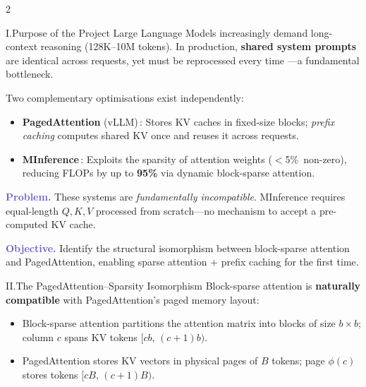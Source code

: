 \documentclass[a0paper]{article}
\begin{document}
\setlength{\columnsep}{1.6cm}
\begin{multicols}{2}

\begin{posterbox}{I.\;\;Purpose of the Project}
  Large Language Models increasingly demand long-context reasoning
  (128K--10M tokens). In production, \textbf{shared system prompts}
  are identical across requests, yet must be reprocessed every time
  ---a fundamental bottleneck.

  \vspace{0.3em}
  Two complementary optimisations exist independently:
  \begin{itemize}[leftmargin=1.6em, itemsep=0.25em, topsep=0.2em]
    \item \textbf{PagedAttention} (vLLM)\,: Stores KV caches in
      fixed-size blocks; \textit{prefix caching} computes shared KV
      once and reuses it across requests.
    \item \textbf{MInference}\,: Exploits the sparsity of attention
      weights ($<$5\%\ non-zero), reducing FLOPs by up to
      \textbf{95\%} via dynamic block-sparse attention.
  \end{itemize}

  \vspace{0.3em}
  \begin{hlbox}
    \textcolor{SlateBlue}{\textbf{Problem.}}\;
    These systems are \textit{fundamentally incompatible}.
    MInference requires equal-length $Q, K, V$ processed from
    scratch---no mechanism to accept a pre-computed KV cache.

    \vspace{0.25em}
    \textcolor{SlateBlue}{\textbf{Objective.}}\;
    Identify the structural isomorphism between block-sparse
    attention and PagedAttention, enabling sparse attention +
    prefix caching for the first time.
  \end{hlbox}
\end{posterbox}

\begin{posterbox}{II.\;\;The PagedAttention--Sparsity Isomorphism}
  Block-sparse attention is \textbf{naturally compatible} with
  PagedAttention's paged memory layout:
  \begin{itemize}[leftmargin=1.6em, itemsep=0.2em, topsep=0.2em]
    \item Block-sparse attention partitions the attention matrix
      into blocks of size $b\!\times\!b$; column $c$ spans KV tokens
      $[cb,\,(c\!+\!1)b)$.
    \item PagedAttention stores KV vectors in physical pages of $B$
      tokens; page $\phi(c)$ stores tokens $[cB,\,(c\!+\!1)B)$.
  \end{itemize}


\end{posterbox}
\end{multicols}
\end{document}
